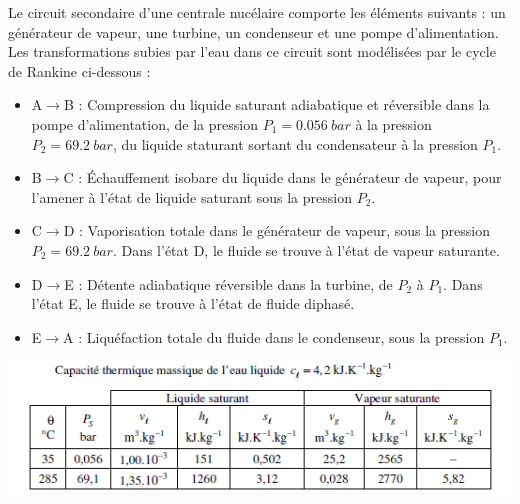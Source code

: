 Le circuit secondaire d'une centrale nucélaire comporte les éléments suivants : un générateur de vapeur, une turbine, un condenseur et une pompe d'alimentation. Les transformations subies par l'eau dans ce circuit sont modélisées par le cycle de Rankine ci-dessous : 
\begin{itemize}
	\item A$\rightarrow$B : Compression du liquide saturant adiabatique et réversible dans la pompe d'alimentation, de la pression $P_1 = \SI{0.056}{bar}$ à la pression $P_2 = \SI{69.2}{bar}$, du liquide staturant sortant du condensateur à la pression $P_1$.
	\item B$\rightarrow$C : Échauffement isobare du liquide dans le générateur de vapeur, pour l'amener à l'état de liquide saturant sous la pression $P_2$.
	\item C$\rightarrow$D : Vaporisation totale dans le générateur de vapeur, sous la pression $P_2 = \SI{69.2}{bar}$. Dans l'état D, le fluide se trouve à l'état de vapeur saturante.
	\item D$\rightarrow$E : Détente adiabatique réversible dans la turbine, de $P_2$ à $P_1$. Dans l'état E, le fluide se trouve à l'état de fluide diphasé.
	\item E$\rightarrow$A : Liquéfaction totale du fluide dans le condenseur, sous la pression $P_1$.
\end{itemize}

\includegraphics[width=\textwidth]{./Images/mp_s18_ex02.png}


